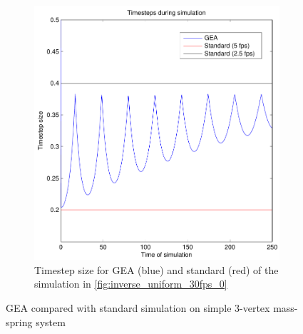 \documentclass[11pt]{article}
\begin{document}
\begin{figure}
\begin{subfigure}[t]{0.5\textwidth}
        \includegraphics[width=\textwidth]{../images/inverse_uniform_30fps_steps.pdf}
        \caption{Timestep size for GEA (blue) and standard (red) of the simulation in
            \ref{fig:inverse_uniform_30fps_0}}
        \label{fig:inverse_uniform_30fps_steps}
    \end{subfigure}
    \caption{GEA compared with standard simulation on simple 3-vertex
    mass-spring system}
    \label{fig:inverse}
\end{figure}
\end{document}
